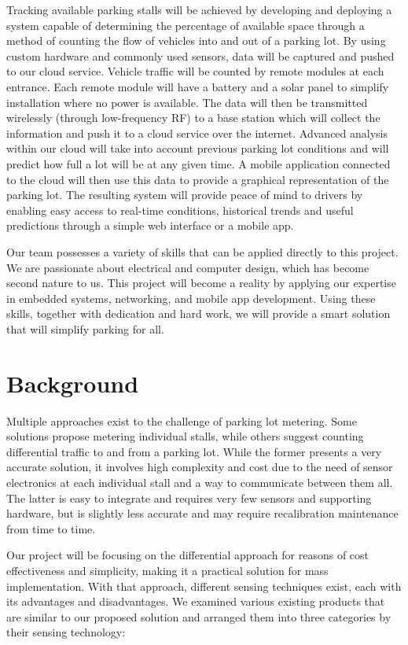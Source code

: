 \documentclass[letterpaper,10 pt,conference,onecolumn]{IEEEtran}
\begin{document}
Tracking available parking stalls will be achieved by developing and deploying a system capable of determining the percentage of available space through a method of counting the flow of vehicles into and out of a parking lot. By using custom hardware and commonly used sensors, data will be captured and pushed to our cloud service. Vehicle traffic will be counted by remote modules at each entrance. Each remote module will have a battery and a solar panel to simplify installation where no power is available. The data will then be transmitted wirelessly (through low-frequency RF) to a base station which will collect the information and push it to a cloud service over the internet. Advanced analysis within our cloud will take into account previous parking lot conditions and will predict how full a lot will be at any given time. A mobile application connected to the cloud will then use this data to provide a graphical representation of the parking lot. The resulting system will provide peace of mind to drivers by enabling easy access to real-time conditions, historical trends and useful predictions through a simple web interface or a mobile app.

Our team possesses a variety of skills that can be applied directly to this project. We are passionate about electrical and computer design, which has become second nature to us. This project will become a reality by applying our expertise in embedded systems, networking, and mobile app development. Using these skills, together with dedication and hard work, we will provide a smart solution that will simplify parking for all.

	\section{Background}
	Multiple approaches exist to the challenge of parking lot metering. Some solutions propose metering individual stalls, while others suggest counting differential traffic to and from a parking lot. While the former presents a very accurate solution, it involves high complexity and cost due to the need of sensor electronics at each individual stall and a way to communicate between them all. The latter is easy to integrate and requires very few sensors and supporting hardware, but is slightly less accurate and may require recalibration maintenance from time to time.
	
	Our project will be focusing on the differential approach for reasons of cost effectiveness and simplicity, making it a practical solution for mass implementation. With that approach, different sensing techniques exist, each with its advantages and disadvantages. We examined various existing products that are similar to our proposed solution and arranged them into three categories by their sensing technology:
	
\end{document}
